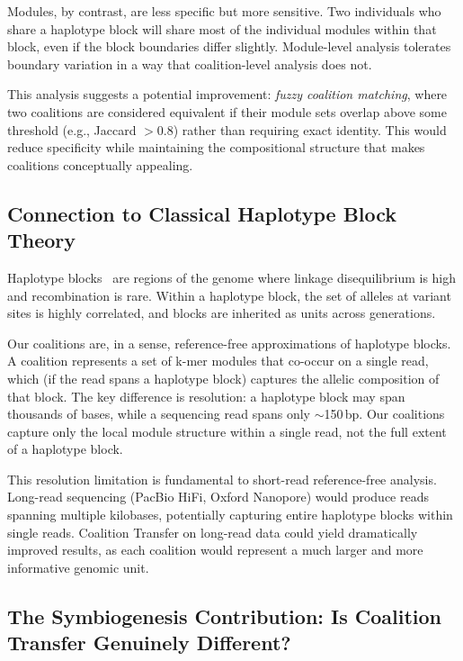 \documentclass{../yalumba}
\begin{document}
Modules, by contrast, are less specific but more sensitive.  Two individuals
who share a haplotype block will share most of the individual modules within
that block, even if the block boundaries differ slightly.  Module-level
analysis tolerates boundary variation in a way that coalition-level analysis
does not.


This analysis suggests a potential improvement: \emph{fuzzy coalition
matching}, where two coalitions are considered equivalent if their module sets
overlap above some threshold (e.g., Jaccard $> 0.8$) rather than requiring
exact identity.  This would reduce specificity while maintaining the
compositional structure that makes coalitions conceptually appealing.

\subsection{Connection to Classical Haplotype Block Theory}
\label{sec:discussion-haplotype}

Haplotype blocks~\cite{ebert2021haplotype} are regions of the genome where
linkage disequilibrium is high and recombination is rare.  Within a haplotype
block, the set of alleles at variant sites is highly correlated, and blocks
are inherited as units across generations.

Our coalitions are, in a sense, reference-free approximations of haplotype
blocks.  A coalition represents a set of k-mer modules that co-occur on a
single read, which (if the read spans a haplotype block) captures the allelic
composition of that block.  The key difference is resolution: a haplotype
block may span thousands of bases, while a sequencing read spans only
$\sim$150\,bp.  Our coalitions capture only the local module structure within
a single read, not the full extent of a haplotype block.

This resolution limitation is fundamental to short-read reference-free
analysis.  Long-read sequencing (PacBio HiFi, Oxford Nanopore) would produce
reads spanning multiple kilobases, potentially capturing entire haplotype
blocks within single reads.  Coalition Transfer on long-read data could yield
dramatically improved results, as each coalition would represent a much larger
and more informative genomic unit.

\subsection{The Symbiogenesis Contribution: Is Coalition Transfer Genuinely Different?}
\label{sec:discussion-symbiogenesis}
\end{document}
